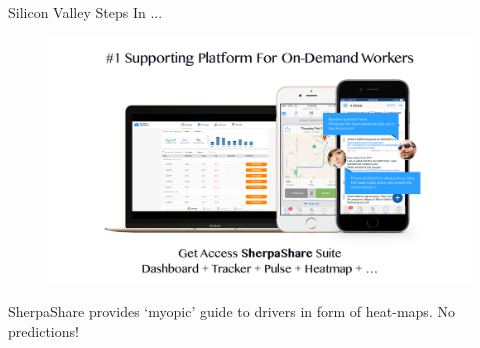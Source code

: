 \begin{frame}{Silicon Valley Steps In ...}
\begin{figure}
\centering
\includegraphics[width=0.8\paperwidth]{figures/sherpa-share.png}
\end{figure}
\begin{center}
SherpaShare provides `myopic' guide to drivers in form of heat-maps. No predictions! 
\end{center}
\end{frame}

